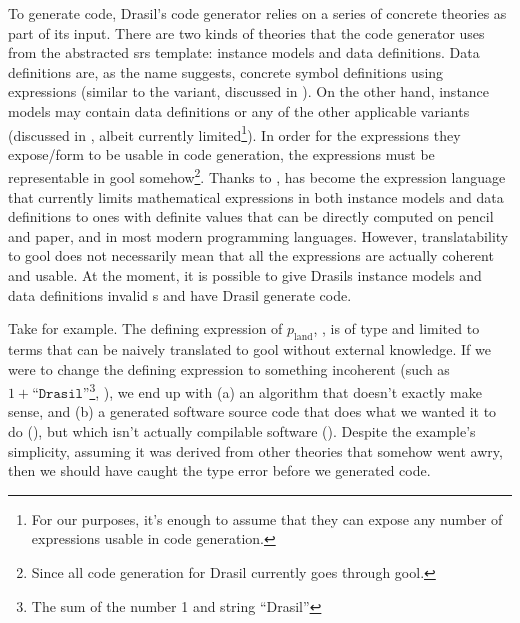 To generate code, Drasil's code generator relies on a series of concrete
theories as part of its input. There are two kinds of theories that the code
generator uses from the abstracted \acs{srs} template: instance models and data
definitions. Data definitions are, as the name suggests, concrete symbol
definitions using expressions (similar to the \EquationalModel{} \ModelKind{}
variant, discussed in
).
On the other hand, instance models may contain data definitions or any of the
other applicable \ModelKinds{} variants (discussed in
, albeit currently limited\footnote{For our
purposes, it's enough to assume that they can expose any number of expressions
usable in code generation.}). In order for the expressions they expose/form to
be usable in code generation, the expressions must be representable in
\acs{gool} somehow\footnote{Since all code generation for Drasil currently goes
through \acs{gool}.}. Thanks to , \Expr{} has become
the expression language that currently limits mathematical expressions in both
instance models and data definitions to ones with definite values that can be
directly computed on pencil and paper, and in most modern programming languages.
However, translatability to \acs{gool} does not necessarily mean that all the
expressions are actually coherent and usable. At the moment, it is possible to
give Drasils instance models and data definitions invalid \Expr{}s and have
Drasil generate code.

\pseudoExampleLandPosQDBadTyping{}

Take  for example. The defining expression of
\(p_\text{land}\), , is of type \Expr{} and limited to
terms that can be naively translated to \acs{gool} without external knowledge.
If we were to change the defining expression to something incoherent (such as
\(1 + \texttt{``Drasil''}\)\footnote{The sum of the number 1 and string
``Drasil''}, ), we end up with (a) an
algorithm that doesn't exactly make sense, and (b) a generated software source
code that does what we wanted it to do
(), but which isn't actually
compilable software ().
Despite the example's simplicity, assuming it was derived from other theories
that somehow went awry, then we should have caught the type error before we
generated code.

